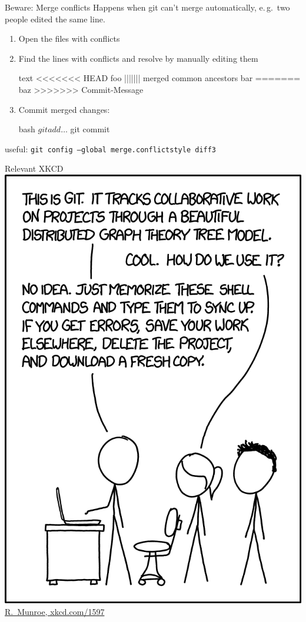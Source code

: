 \begin{frame}[fragile]{Beware: Merge conflicts}
  Happens when git can't merge automatically, e.\,g.\ two people edited the same line.

  \begin{enumerate}
    \item Open the files with conflicts
    \item Find the lines with conflicts and resolve by manually editing them
      \begin{code}{text}
        <<<<<<< HEAD
        foo
        ||||||| merged common ancestors
        bar
        =======
        baz
        >>>>>>> Commit-Message
      \end{code}
    \item Commit merged changes:
      \begin{code}{bash}
        $ git add …
        $ git commit
      \end{code}
  \end{enumerate}
  useful: \texttt{git config --global merge.conflictstyle diff3}
\end{frame}

\begin{frame}[t]{Relevant XKCD}%
  \centering%
  \includegraphics[height=0.95\textheight]{images/xkcd.png}%
  \href{https://xkcd.com/1597}{R.~Munroe, xkcd.com/1597}%
\end{frame}

